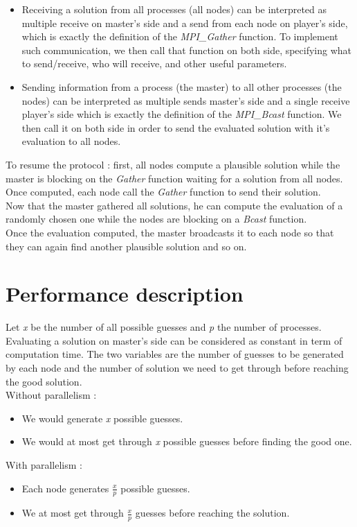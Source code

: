 \documentclass{article}
\begin{document}
\begin{itemize}
    \item Receiving a solution from all processes (all nodes) can be interpreted as multiple receive on master's side and a send from each node on player's side, which is exactly the definition of the \textit{MPI\_Gather} function. To implement such communication, we then call that function on both side, specifying what to send/receive, who will receive, and other useful parameters. 
    
    \item Sending information from a process (the master) to all other processes (the nodes) can be interpreted as multiple sends master's side and a single receive player's side which is exactly the definition of the \textit{MPI\_Bcast} function. We then call it on both side in order to send the evaluated solution with it's evaluation to all nodes. 
\end{itemize}

\noindent To resume the protocol : first, all nodes compute a plausible solution while the master is blocking on the \textit{Gather} function waiting for a solution from all nodes. Once computed, each node call the \textit{Gather} function to send their solution.\\
Now that the master gathered all solutions, he can compute the evaluation of a randomly chosen one while the nodes are blocking on a \textit{Bcast} function. \\
Once the evaluation computed, the master broadcasts it to each node so that they can again find another plausible solution and so on.



\section{Performance description}

Let \textit{x} be the number of all possible guesses and \textit{p}  the number of processes. \\
Evaluating a solution on master's side can be considered as constant in term of computation time. 
The two variables are the number of guesses to be generated by each node and the number of solution we need to get through before reaching the good solution.\\
Without parallelism : 
\begin{itemize}
    \item We would generate \textit{x} possible guesses.
    \item We would at most get through \textit{x} possible guesses before finding the good one.
\end{itemize}
With parallelism : 
\begin{itemize}
    \item Each node generates $\frac{x}{p}$ possible guesses.
    \item We at most get through $\frac{x}{p}$ guesses before reaching the solution.
\end{itemize}
\end{document}
